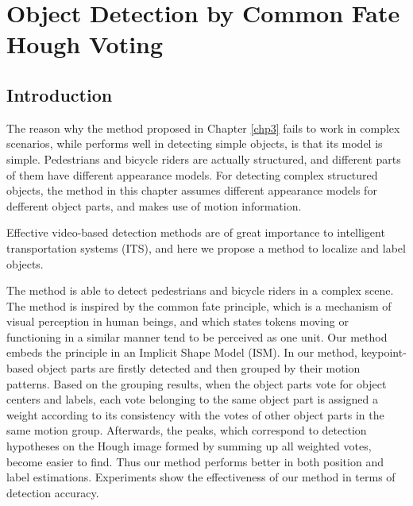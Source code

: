 \chapter{Object Detection by Common Fate Hough Voting}
\label{chp4}
\section{Introduction}

The reason why the method proposed in  Chapter \ref{chp3} fails to work  in complex scenarios, while performs well in detecting simple objects, is that its model is simple. Pedestrians and bicycle riders are actually structured, and different parts of them  have different appearance models. For detecting complex structured objects, the method in this chapter assumes different appearance models for defferent object parts, and makes use of motion information.

Effective video-based detection methods are of great importance to intelligent transportation systems (ITS), and here we propose a method to localize and label objects.

The method is able to detect pedestrians and bicycle riders in a complex scene. The method is inspired by the common fate principle, which is a mechanism of visual perception in human beings, and which states  tokens moving or functioning in a similar manner tend to be  perceived
as one unit. Our method embeds the principle in an Implicit Shape Model (ISM). In our method, keypoint-based
object parts are firstly detected and then grouped by their motion patterns. Based on the grouping results, when the object parts vote for object centers and labels, each vote belonging to the same object part is assigned a weight according to its consistency with the votes of other object parts in the same motion group. Afterwards, the peaks, which correspond to detection hypotheses on the Hough image formed by summing up all weighted votes, become easier to find. Thus our method  performs better in both position and label estimations. Experiments show the effectiveness of our method in terms of detection accuracy.


